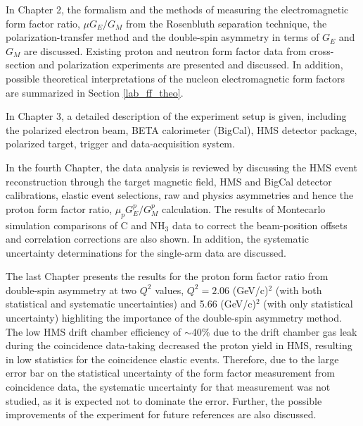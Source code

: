 In Chapter 2, the formalism and the methods of measuring the electromagnetic form factor ratio,  $\mu G_E/G_M$ from the Rosenbluth separation technique, the polarization-transfer method and the double-spin asymmetry in terms of $G_E$  and $G_M$ are discussed. Existing proton and neutron form factor data from cross-section and polarization experiments are presented and discussed.  In addition, possible theoretical interpretations of the nucleon electromagnetic form factors are summarized in Section \ref{lab_ff_theo}.

In Chapter 3, a detailed description of the experiment setup is given, including the polarized electron beam, BETA calorimeter (BigCal), HMS detector package, polarized target, trigger and data-acquisition system. 

In the fourth Chapter, the data analysis is reviewed by discussing the HMS event reconstruction through the target magnetic field, HMS and BigCal detector calibrations, elastic event selections, raw and physics asymmetries and hence the proton form factor ratio, $\mu_p G_E^p/G_M^p$ calculation. The results of Montecarlo simulation  comparisons of C and NH$_3$ data to correct the beam-position offsets and correlation corrections are also shown. In addition, the systematic uncertainty determinations for the single-arm data are discussed.

The last Chapter presents the results for the proton form factor ratio from double-spin asymmetry at two $Q^2$ values, $Q^2=2.06$ (GeV/c)$^2$ (with both statistical and systematic uncertainties) and 5.66 (GeV/c)$^2$ (with only statistical uncertainty) highliting the importance of the double-spin asymmetry method. The low HMS drift chamber efficiency of $\sim$40\% due to the drift chamber gas leak during the coincidence data-taking decreased the proton yield in HMS, resulting in low statistics for the coincidence elastic events. Therefore, due to the large error bar on the statistical uncertainty of the form factor measurement from coincidence data, the systematic uncertainty for that measurement was not studied, as it is expected not to dominate the error. Further, the possible improvements of the experiment for future references are also discussed. 

